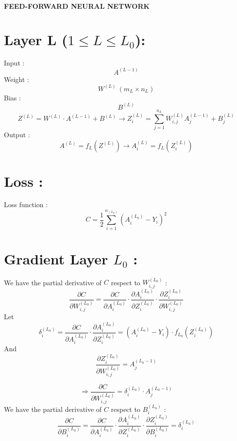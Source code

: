 \documentclass{article}
\begin{document}
    \begin{center}
        {\Large \textbf{FEED-FORWARD NEURAL NETWORK}}
    \end{center}
    \section*{Layer L ($1 \leq L \leq L_0$): }
    Input :
    \[A^{(L-1)}\]
    Weight : 
    \[W^{(L)} \ (m_L \times n_L)\]
    Bias : 
    \[B^{(L)}\]
    \[
        Z^{(L)} = W^{(L)} \cdot A^{(L-1)} + B^{(L)} \rightarrow
        Z^{(L)}_i = \sum_{j = 1}^{n_L}W^{(L)}_{i, j}A^{(L-1)}_j + B^{(L)}_j
    \]
    Output : 
    \[
        A^{(L)} = f_L(Z^{(L)}) \rightarrow 
        A^{(L)}_i = f_L(Z^{(L)}_i)
    \] 


    \section*{Loss :}
    Loss function :
    \[
        C = \frac{1}{2}\sum_{i = 1}^{n_{(L_0)}}\left(
            A^{(L_0)}_i - Y_i
        \right)^2
    \]
    \section*{Gradient Layer $L_0$ :}
    We have the partial derivative of $C$ respect to $W^{(L_0)}_{i, j}$ : 
    \[
        \frac{\partial C}{\partial W^{(L_0)}_{i, j}} = 
        \frac{\partial C}{\partial A^{(L_0)}_{i}} \cdot
        \frac{\partial A^{(L_0)}_{i}}{\partial Z^{(L_0)}_i} \cdot
        \frac{\partial Z^{(L_0)}_i}{\partial W^{(L_0)}_{i, j}}
    \]  
    Let
    \[
        \delta^{(L_0)}_i = 
        \frac{\partial C}{\partial A^{(L_0)}_{i}} \cdot
        \frac{\partial A^{(L_0)}_{i}}{\partial Z^{(L_0)}_i} =
        (A^{(L_0)}_i - Y_i) \cdot f^{\prime}_{L_0}\left(Z^{(L_0)}_i\right)
    \]
    And 
    \[
        \frac{\partial Z^{(L_0)}_i}{\partial W^{(L_0)}_{i, j}} = A^{(L_0-1)}_j
    \]  

    \[
        \Rightarrow \frac{\partial C}{\partial W^{(L_0)}_{i, j}} = 
        \delta^{(L_0)}_i \cdot A^{(L_0-1)}_j
    \]
    We have the partial derivative of $C$ respect to $B^{(L_0)}_i$ :
    \[
        \frac{\partial C}{\partial B^{(L_0)}_{i}} = 
        \frac{\partial C}{\partial A^{(L_0)}_{i}} \cdot
        \frac{\partial A^{(L_0)}_{i}}{\partial Z^{(L_0)}_i} \cdot
        \frac{\partial Z^{(L_0)}_i}{\partial B^{(L_0)}_{i}} = 
        \delta^{(L_0)}_i
    \]
\end{document}
